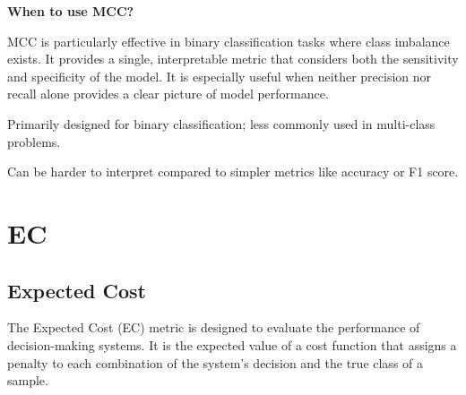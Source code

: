 \textbf{When to use MCC?}

MCC is particularly effective in binary classification tasks where class imbalance exists. It provides a single, interpretable metric that considers both the sensitivity and specificity of the model.
It is especially useful when neither precision nor recall alone provides a clear picture of model performance.

{ 
\item Primarily designed for binary classification; less commonly used in multi-class problems. 
\item Can be harder to interpret compared to simpler metrics like accuracy or F1 score. 
}

\clearpage
\thispagestyle{classificationstyle}
\section{EC}
\subsection{Expected Cost}

The Expected Cost (EC) metric is designed to evaluate the performance of decision-making systems. It is the expected value of a cost function that assigns a penalty to each combination of the system's decision and the true class of a sample. 

\begin{center}
\end{center}

